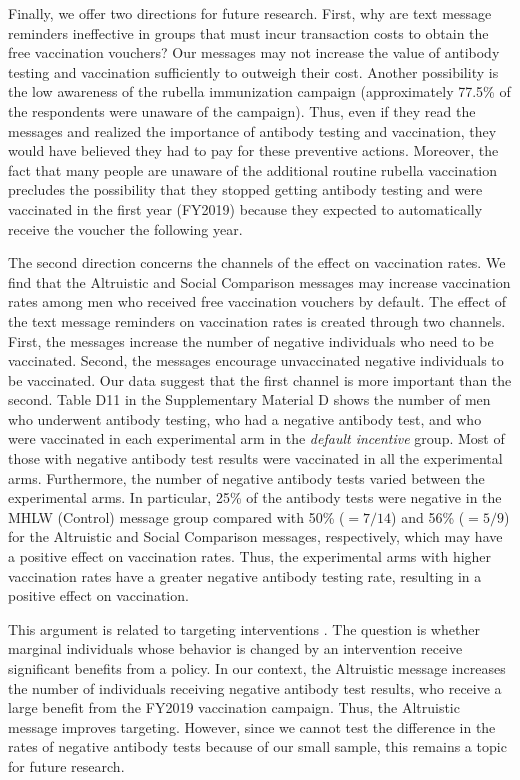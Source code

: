 \documentclass[
  11pt,
  a4paper
]{article}
\begin{document}
Finally, we offer two directions for future research. First, why are text message reminders ineffective in groups that must incur transaction costs to obtain the free vaccination vouchers? Our messages may not increase the value of antibody testing and vaccination sufficiently to outweigh their cost. Another possibility is the low awareness of the rubella immunization campaign (approximately 77.5\% of the respondents were unaware of the campaign). Thus, even if they read the messages and realized the importance of antibody testing and vaccination, they would have believed they had to pay for these preventive actions. Moreover, the fact that many people are unaware of the additional routine rubella vaccination precludes the possibility that they stopped getting antibody testing and were vaccinated in the first year (FY2019) because they expected to automatically receive the voucher the following year.

The second direction concerns the channels of the effect on vaccination rates. We find that the Altruistic and Social Comparison messages may increase vaccination rates among men who received free vaccination vouchers by default. The effect of the text message reminders on vaccination rates is created through two channels. First, the messages increase the number of negative individuals who need to be vaccinated. Second, the messages encourage unvaccinated negative individuals to be vaccinated. Our data suggest that the first channel is more important than the second. Table D11 in the Supplementary Material D shows the number of men who underwent antibody testing, who had a negative antibody test, and who were vaccinated in each experimental arm in the \emph{default incentive} group. Most of those with negative antibody test results were vaccinated in all the experimental arms. Furthermore, the number of negative antibody tests varied between the experimental arms. In particular, 25\% of the antibody tests were negative in the MHLW (Control) message group compared with 50\% (\(=7/14\)) and 56\% (\(=5/9\)) for the Altruistic and Social Comparison messages, respectively, which may have a positive effect on vaccination rates. Thus, the experimental arms with higher vaccination rates have a greater negative antibody testing rate, resulting in a positive effect on vaccination.

This argument is related to targeting interventions \citep[e.g.,][]{Finkelstein2019}. The question is whether marginal individuals whose behavior is changed by an intervention receive significant benefits from a policy. In our context, the Altruistic message increases the number of individuals receiving negative antibody test results, who receive a large benefit from the FY2019 vaccination campaign. Thus, the Altruistic message improves targeting. However, since we cannot test the difference in the rates of negative antibody tests because of our small sample, this remains a topic for future research.
\end{document}
